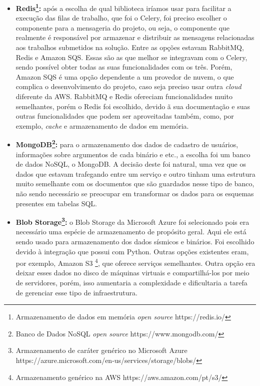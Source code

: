 \documentclass[11pt,twoside]{article}
\begin{document}
\begin{itemize}
  \item \textbf{Redis\footnote{Armazenamento de dados em memória \emph{open source} https://redis.io/}:} após a escolha de qual biblioteca iríamos usar para facilitar a execução das filas de trabalho, que foi o Celery, foi preciso escolher o componente para a mensageria do projeto, ou seja, o
  componente que realmente é responsável por armazenar e distribuir as mensagens relacionadas aos trabalhos submetidos na solução. Entre as opções estavam RabbitMQ, Redis e Amazon SQS. Essas são as que melhor se 
  integravam com o Celery, sendo possível obter todas as suas funcionalidades com os três. Porém, Amazon SQS é uma opção dependente a um provedor de nuvem, o que complica o desenvolvimento do projeto, caso seja 
  preciso usar outra \emph{cloud} diferente da AWS. RabbitMQ e Redis ofereciam funcionalidades muito semelhantes, porém o Redis foi escolhido, devido ã sua documentação e suas outras funcionalidades
  que podem ser aproveitadas também, como, por exemplo, \emph{cache} e armazenamento de dados em memória.

  \item \textbf{MongoDB\footnote{Banco de Dados NoSQL \emph{open source} https://www.mongodb.com/}:} para o armazenamento dos dados de cadastro de usuários, informações sobre argumentos de cada binário e etc., a escolha foi um banco de dados NoSQL, o MongoDB. A decisão deste
  foi natural, uma vez que os dados que estavam trafegando entre um serviço e outro tinham uma estrutura muito semelhante com os documentos que são guardados nesse tipo de banco, não sendo necessário se preocupar
  em transformar os dados para os esquemas presentes em tabelas SQL.

  \item \textbf{Blob Storage\footnote{Armazenamento de caráter genérico no Microsoft Azure https://azure.microsoft.com/en-us/services/storage/blobs/}:} o Blob Storage da Microsoft Azure foi selecionado pois era necessário uma espécie de armazenamento de propósito geral. Aqui ele está sendo usado para armazenamento dos dados sísmicos e
  binários. Foi escolhido devido à integração que possui com Python. Outras opções existentes eram, por exemplo, Amazon S3 \footnote{Armazenamento genérico na AWS https://aws.amazon.com/pt/s3/}, que oferece serviços semelhantes. Outra opção era deixar esses dados 
  no disco de máquinas virtuais e compartilhá-los por meio de servidores, porém, isso aumentaria a complexidade e dificultaria a tarefa de gerenciar esse tipo de infraestrutura.
\end{itemize}
\end{document}
